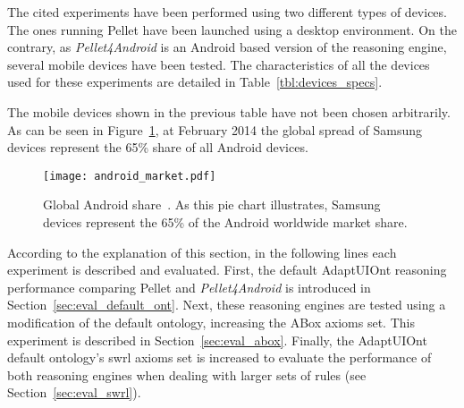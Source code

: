 % 


The cited experiments have been performed using two different types of devices. 
The ones running Pellet have been launched using a desktop environment. On the 
contrary, as \textit{Pellet4Android} is an Android based version of the reasoning 
engine, several mobile devices have been tested. The characteristics of all the 
devices used for these experiments are detailed in Table~\ref{tbl:devices_specs}. 



The mobile devices shown in the previous table have not been chosen arbitrarily.
As can be seen in Figure~\ref{fig:android_market}, at February 2014 the global
spread of Samsung devices represent the 65\% share of all Android devices.

\begin{figure}
\centering
\texttt{[image: android\_market.pdf]}
\caption{Global Android share~\citep{samsung_share_2014}. As this pie chart
illustrates, Samsung devices represent the 65\% of the Android worldwide market
share.}
\label{fig:android_market}
\end{figure}

According to the explanation of this section, in the following lines each 
experiment is described and evaluated. First, the default AdaptUIOnt reasoning 
performance comparing Pellet and \textit{Pellet4Android} is introduced in 
Section~\ref{sec:eval_default_ont}. Next, these reasoning engines are 
tested using a modification of the default ontology, increasing the ABox axioms 
set. This experiment is described in Section~\ref{sec:eval_abox}. 
Finally, the AdaptUIOnt default ontology's \ac{swrl} axioms set is increased to 
evaluate the performance of both reasoning engines when dealing with larger 
sets of rules (see Section~\ref{sec:eval_swrl}).


